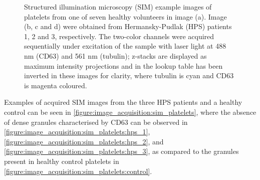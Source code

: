 \begin{figure}[htbp]\centering
	\begin{subfigure}[b]{0.49\linewidth}
		\centering
		\caption{}
		\label{figure:image_acquisition:sim_platelets:control}
	\end{subfigure}
	\begin{subfigure}[b]{0.49\linewidth}
		\centering
		\caption{}
		\label{figure:image_acquisition:sim_platelets:hps_1}
	\end{subfigure}
	\begin{subfigure}[b]{0.49\linewidth}
		\centering
		\caption{}
		\label{figure:image_acquisition:sim_platelets:hps_2}
	\end{subfigure}
	\begin{subfigure}[b]{0.49\linewidth}
		\centering
		\caption{}
		\label{figure:image_acquisition:sim_platelets:hps_3}
	\end{subfigure}
	\caption[Structured illumination microscopy images of platelets]{Structured illumination microscopy (SIM) example images of platelets from one of seven healthy volunteers in image (a). Image (b, c and d) were obtained from Hermansky-Pudlak (HPS) patients 1, 2 and 3, respectively. The two-color channels were acquired sequentially under excitation of the sample with laser light at 488 nm (CD63) and 561 nm (tubulin); z-stacks are displayed as maximum intensity projections and in the lookup table has been inverted in these images for clarity, where tubulin is cyan and CD63 is magenta coloured.}
	\label{figure:image_acquisition:sim_platelets}
\end{figure}

Examples of acquired SIM images from the three HPS patients and a healthy control can be seen in \autoref{figure:image_acquisition:sim_platelets}, where the absence of dense granules characterised by CD63 can be observed in \autoref{figure:image_acquisition:sim_platelets:hps_1}, \autoref{figure:image_acquisition:sim_platelets:hps_2}, and \autoref{figure:image_acquisition:sim_platelets:hps_3}, as compared to the granules present in healthy control platelets in \autoref{figure:image_acquisition:sim_platelets:control}.

